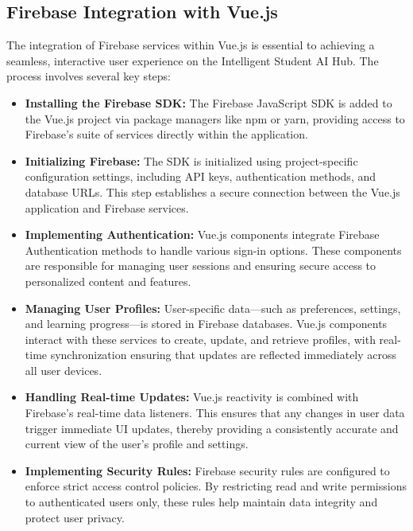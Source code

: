 \subsection{Firebase Integration with Vue.js}

The integration of Firebase services within Vue.js is essential to achieving a seamless, interactive user experience on the Intelligent Student AI Hub. The process involves several key steps:

\begin{itemize}
    \item \textbf{Installing the Firebase SDK:} The Firebase JavaScript SDK is added to the Vue.js project via package managers like npm or yarn, providing access to Firebase’s suite of services directly within the application.
    
    \item \textbf{Initializing Firebase:} The SDK is initialized using project-specific configuration settings, including API keys, authentication methods, and database URLs. This step establishes a secure connection between the Vue.js application and Firebase services.
    
    \item \textbf{Implementing Authentication:} Vue.js components integrate Firebase Authentication methods to handle various sign-in options. These components are responsible for managing user sessions and ensuring secure access to personalized content and features.
    
    \item \textbf{Managing User Profiles:} User-specific data—such as preferences, settings, and learning progress—is stored in Firebase databases. Vue.js components interact with these services to create, update, and retrieve profiles, with real-time synchronization ensuring that updates are reflected immediately across all user devices.
    
    \item \textbf{Handling Real-time Updates:} Vue.js reactivity is combined with Firebase’s real-time data listeners. This ensures that any changes in user data trigger immediate UI updates, thereby providing a consistently accurate and current view of the user’s profile and settings.
    
    \item \textbf{Implementing Security Rules:} Firebase security rules are configured to enforce strict access control policies. By restricting read and write permissions to authenticated users only, these rules help maintain data integrity and protect user privacy.
\end{itemize}

